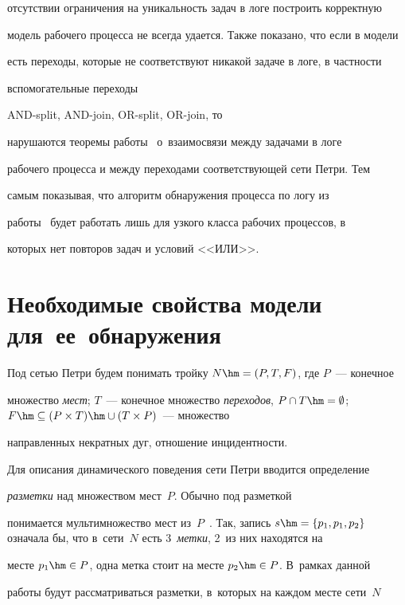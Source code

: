 отсутствии ограничения на уникальность задач в логе построить корректную 

модель рабочего процесса не всегда удается. Также показано, что если в модели 

есть переходы, которые не соответствуют никакой задаче в логе, в частности 

вспомогательные переходы  

{AND-split}, {AND-join}, {OR-split}, {OR-join}, то 

нарушаются теоремы работы~\cite{5-tg} о~взаимосвязи между задачами в логе 

рабочего процесса и между переходами соответствующей сети Петри. Тем 

самым показывая, что алгоритм обнаружения процесса по логу из 

работы~\cite{5-tg} будет работать лишь для узкого класса рабочих процессов, в 

которых нет повторов задач и условий <<ИЛИ>>.

  

  

  \section{Необходимые свойства модели для~ее~обнаружения}

   

  Под сетью Петри будем понимать тройку $N\hm=(P,T,F)$, где $P$~--- конечное 

множество \textit{мест}; $T$~--- конечное множество \textit{переходов}, $P\cap 

T\hm=\emptyset$; $F\hm\subseteq (P\times T)\hm\cup (T\times P)$~--- множество 

направленных некратных дуг, отношение инцидентности. 

  

  Для описания динамического поведения сети Петри вводится определение 

\textit{разметки} над множеством мест~$P$. Обычно под разметкой 

понимается мультимножество мест из~$P$~\cite{5-tg}. Так, запись $s\hm= \{ p_1, p_1, 

p_2\}$ означала бы, что в~сети~$N$ есть 3~\textit{метки}, 2~из них находятся на 

месте $p_1\hm\in P$, одна метка стоит на месте $p_2\hm\in P$. В~рамках данной 

работы будут рассматриваться разметки, в~которых на каждом месте сети~$N$ 

